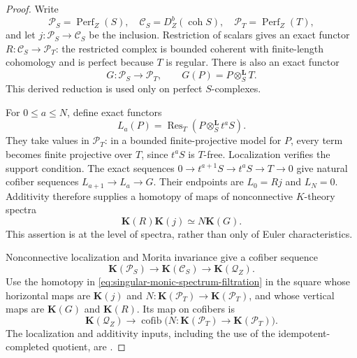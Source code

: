 \begin{proof}
Write
\[
 \mathcal P_S=\operatorname{Perf}_Z(S),\quad
 \mathcal C_S=D^b_Z(\operatorname{coh}S),\quad
 \mathcal P_T=\operatorname{Perf}_Z(T),
\]
and let \(j:\mathcal P_S\to\mathcal C_S\) be the inclusion.
Restriction of scalars gives an exact functor
\(R:\mathcal C_S\to\mathcal P_T\): the restricted complex is bounded
coherent with finite-length cohomology and is perfect because \(T\)
is regular.  There is also an exact functor
\[
 G:\mathcal P_S\longrightarrow\mathcal P_T,
       \qquad G(P)=P\otimes_S^{\mathbf L}T.
\]
This derived reduction is used only on perfect \(S\)-complexes.

For \(0\le a\le N\), define exact functors
\[
 L_a(P)=\operatorname{Res}_T(P\otimes_S^{\mathbf L}t^aS).
\]
They take values in \(\mathcal P_T\): in a bounded finite-projective
model for \(P\), every term becomes finite projective over \(T\),
since \(t^aS\) is \(T\)-free.  Localization verifies the support
condition.  The exact sequences
\(0\to t^{a+1}S\to t^aS\to T\to0\) give natural cofiber sequences
\(L_{a+1}\to L_a\to G\).  Their endpoints are \(L_0=Rj\) and
\(L_N=0\).  Additivity therefore supplies a homotopy of maps of
nonconnective \(K\)-theory spectra
\begin{equation}\label{eq:singular-monic-spectrum-filtration}
 \mathbf K(R)\mathbf K(j)\simeq N\mathbf K(G).
\end{equation}
This assertion is at the level of spectra, rather than only of Euler
characteristics.

Nonconnective localization and Morita invariance give a cofiber sequence
\[
 \mathbf K(\mathcal P_S)\longrightarrow\mathbf K(\mathcal C_S)
      \longrightarrow\mathbf K(\mathcal Q_Z).
\]
Use the homotopy in \eqref{eq:singular-monic-spectrum-filtration} in
the square whose horizontal maps are \(\mathbf K(j)\) and
\(N:\mathbf K(\mathcal P_T)\to\mathbf K(\mathcal P_T)\), and whose
vertical maps are \(\mathbf K(G)\) and \(\mathbf K(R)\).
Its map on cofibers is
\begin{equation}\label{eq:singular-monic-cofiber-map}
 \mathbf K(\mathcal Q_Z)\longrightarrow
 \operatorname{cofib}\bigl(N:\mathbf K(\mathcal P_T)
                                  \to\mathbf K(\mathcal P_T)\bigr).
\end{equation}
The localization and additivity inputs, including the use of the
idempotent-completed quotient, are
\citet[Theorem 9.8, p.~808; the localization consequence on p.~814;
Remark 9.33 and Theorem 9.34, pp.~815--816]{BlumbergGepnerTabuada2013}.


\end{proof}
